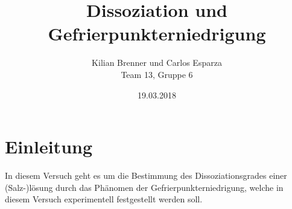 \documentclass[12pt,a4paper]{article}
\title{Dissoziation und Gefrierpunkterniedrigung}
\author{Kilian Brenner und Carlos Esparza \\ Team 13, Gruppe 6}
\date{19.03.2018}
\begin{document}
\maketitle
\tableofcontents
\newpage

\section{Einleitung}
In diesem Versuch geht es um die Bestimmung des Dissoziationsgrades einer (Salz-)lösung durch das Phänomen der Gefrierpunkterniedrigung, welche in diesem Versuch experimentell festgestellt werden soll.












%
\end{document}
